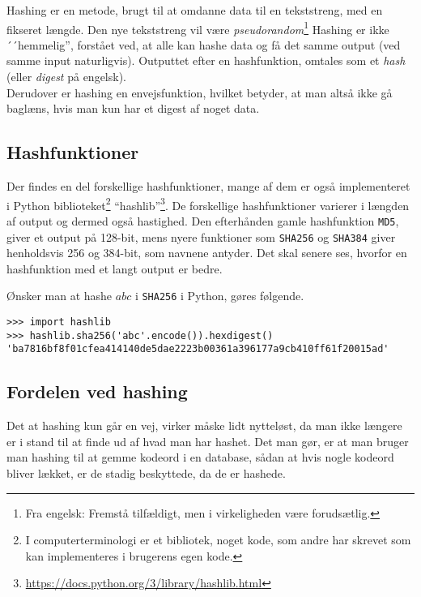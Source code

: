 Hashing er en metode, brugt til at omdanne data til en tekststreng, med en fikseret længde.
Den nye tekststreng vil være \emph{pseudorandom}\footnote{Fra engelsk: Fremstå tilfældigt, men i virkeligheden være forudsætlig.} %
Hashing er ikke ´´hemmelig'', forstået ved, at alle kan hashe data og få det samme output (ved samme input naturligvis).
Outputtet efter en hashfunktion, omtales som et \emph{hash} (eller \emph{digest} på engelsk).
\\
Derudover er hashing en envejsfunktion, hvilket betyder, at man altså ikke gå baglæns, hvis man kun har et digest af noget data.\cite{algoritmer}


\subsection{Hashfunktioner}
Der findes en del forskellige hashfunktioner, mange af dem er også implementeret i Python biblioteket\footnote{I computerterminologi er et bibliotek, noget kode, som andre har skrevet som kan implementeres i brugerens egen kode.} ``hashlib''\footnote{\url{https://docs.python.org/3/library/hashlib.html}}.
De forskellige hashfunktioner varierer i længden af output og dermed også hastighed.
Den efterhånden gamle hashfunktion \texttt{MD5}, giver et output på 128-bit, mens nyere funktioner som \texttt{SHA256} og \texttt{SHA384} giver henholdsvis 256 og 384-bit, som navnene antyder.
Det skal senere ses, hvorfor en hashfunktion med et langt output er bedre.

Ønsker man at hashe \(abc\) i \texttt{SHA256} i Python, gøres følgende.
\begin{verbatim}
>>> import hashlib
>>> hashlib.sha256('abc'.encode()).hexdigest()
'ba7816bf8f01cfea414140de5dae2223b00361a396177a9cb410ff61f20015ad'
\end{verbatim}


\subsection{Fordelen ved hashing}
Det at hashing kun går en vej, virker måske lidt nytteløst, da man ikke længere er i stand til at finde ud af hvad man har hashet.
Det man gør, er at man bruger man hashing til at gemme kodeord i en database, sådan at hvis nogle kodeord bliver lækket, er de stadig beskyttede, da de er hashede.


